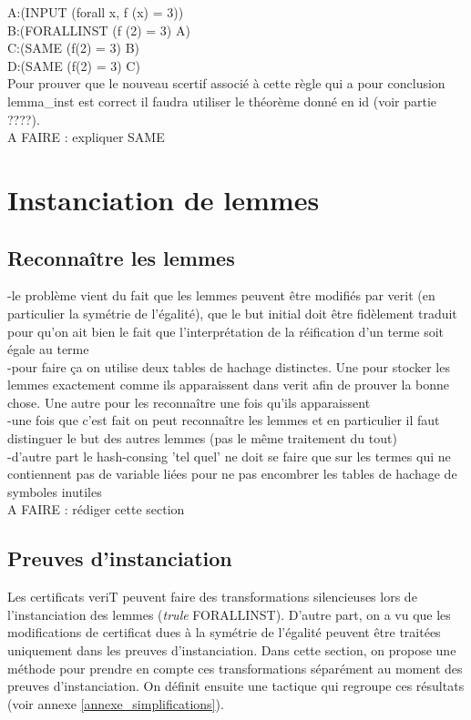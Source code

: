 \documentclass[11pt]{article}
\begin{document}
A:(INPUT (forall x, f (x) = 3)) \\
B:(FORALLINST (f (2) = 3) A) \\
C:(SAME (f(2) = 3) B) \\
D:(SAME (f(2) = 3) C) \\

Pour prouver que le nouveau scertif associé à cette règle qui a pour conclusion lemma\_inst est correct il faudra utiliser le théorème donné en id (voir partie ????).\\

A FAIRE : expliquer SAME


\section{Instanciation de lemmes} \label{instanciations}

\subsection{Reconnaître les lemmes}
-le problème vient du fait que les lemmes peuvent être modifiés par verit (en particulier la symétrie de l'égalité), que le but initial doit être fidèlement traduit pour qu'on ait bien le fait que l'interprétation de la réification d'un terme soit égale au terme \\
-pour faire ça on utilise deux tables de hachage distinctes. Une pour stocker les lemmes exactement comme ils apparaissent dans verit afin de prouver la bonne chose. Une autre pour les reconnaître une fois qu'ils apparaissent\\
-une fois que c'est fait on peut reconnaître les lemmes et en particulier il faut distinguer le but des autres lemmes (pas le même traitement du tout)\\
-d'autre part le hash-consing 'tel quel' ne doit se faire que sur les termes qui ne contiennent pas de variable liées pour ne pas encombrer les tables de hachage de symboles inutiles\\

A FAIRE : rédiger cette section



\subsection{Preuves d'instanciation}

Les certificats veriT peuvent faire des transformations silencieuses lors de l'instanciation des lemmes (\textit{trule} FORALLINST). D'autre part, on a vu que les modifications de certificat dues à la symétrie de l'égalité peuvent être traitées uniquement dans les preuves d'instanciation. Dans cette section, on propose une méthode pour prendre en compte ces transformations séparément au moment des preuves d'instanciation. On définit ensuite une tactique qui regroupe ces résultats (voir annexe \ref{annexe_simplifications}).
\end{document}
